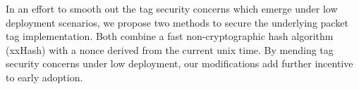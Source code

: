 \documentclass[12pt]{article} %
\begin{document}
In an effort to smooth out the tag security concerns which emerge under low deployment scenarios, we propose two methods to secure the underlying packet tag implementation. Both combine a fast non-cryptographic hash algorithm (xxHash) with a nonce derived from the current unix time. By mending tag security concerns under low deployment, our modifications add further incentive to early adoption.








\end{document}
